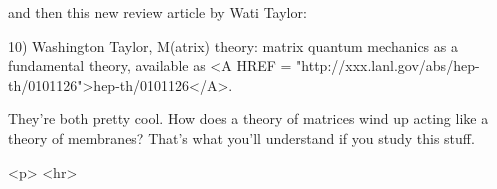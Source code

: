 and then this new review article by Wati Taylor:

10) Washington Taylor, M(atrix) theory: matrix quantum mechanics as a
fundamental theory, available as <A HREF = "http://xxx.lanl.gov/abs/hep-th/0101126">hep-th/0101126</A>.


They're both pretty cool.  How does a theory of matrices wind up 
acting like a theory of membranes?  That's what you'll understand
if you study this stuff.







<p> <hr>



